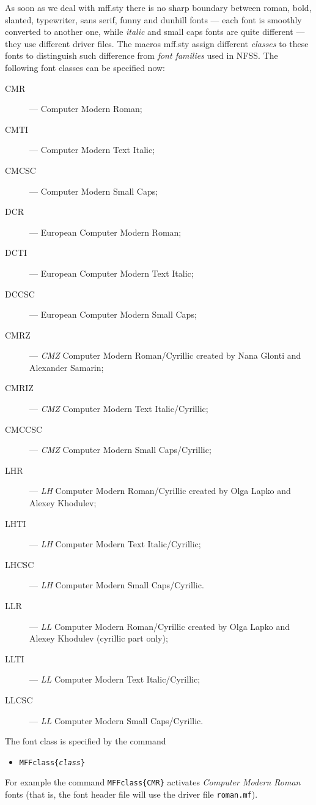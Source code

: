 As soon as we deal with {\sc mff.sty} there is no sharp boundary
between {\cmcmr roman}, {\cmcmbx bold}, {\cmcmsl slanted},
{\cmcmtt typewriter}, {\cmcmss sans serif}, {\cmfunny funny} and
{\cmdunh dunhill} fonts --- each font is smoothly
converted to another one, while {\em italic} and {\sc small caps}
fonts are quite different --- they use different driver files.
The macros {\sc mff.sty} assign different {\em classes} to these fonts
to distinguish such difference from {\em font families}
used in NFSS. The following font classes can be specified now:
\begin{description}
\item[\quad CMR] --- Computer Modern Roman;
\item[\quad CMTI] --- Computer Modern Text Italic;
\item[\quad CMCSC] --- Computer Modern Small Caps;
\item[\quad DCR] --- European Computer Modern Roman;
\item[\quad DCTI] --- European Computer Modern Text Italic;
\item[\quad DCCSC] --- European Computer Modern Small Caps;
\item[\quad CMRZ] --- {\sl CMZ} Computer Modern Roman/Cyrillic
              created by Nana Glonti and Alexander Samarin;
\item[\quad CMRIZ] --- {\sl CMZ} Computer Modern Text Italic/Cyrillic;
\item[\quad CMCCSC] --- {\sl CMZ} Computer Modern Small Caps/Cyrillic;
\item[\quad LHR] --- {\sl LH} Computer Modern Roman/Cyrillic
              created by Olga Lapko and Alexey Khodulev;
\item[\quad LHTI] --- {\sl LH} Computer Modern Text Italic/Cyrillic;
\item[\quad LHCSC] --- {\sl LH} Computer Modern Small Caps/Cyrillic.
\item[\quad LLR] --- {\sl LL} Computer Modern Roman/Cyrillic
              created by Olga Lapko and Alexey Khodulev
              (cyrillic part only);
\item[\quad LLTI] --- {\sl LL} Computer Modern Text Italic/Cyrillic;
\item[\quad LLCSC] --- {\sl LL} Computer Modern Small Caps/Cyrillic.
\end{description}
The font class is specified by the command
\begin{itemize}
\item[]{\tt \bs{}MFFclass\{{\em class}\}}
\end{itemize}
For example the command {\tt \bs{}MFFclass\{CMR\}}
activates {\sl Computer Modern Roman} fonts
(that is, the font header file will use the driver file
{\tt roman.mf}).


